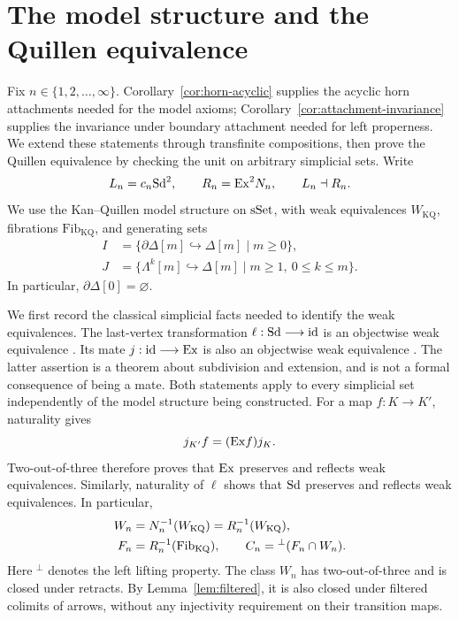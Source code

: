 \section{The model structure and the Quillen equivalence}
\label{sec:transfer}

Fix $n\in\{1,2,\ldots,\infty\}$.
Corollary~\ref{cor:horn-acyclic} supplies the acyclic horn attachments
needed for the model axioms; Corollary~\ref{cor:attachment-invariance}
supplies the invariance under boundary attachment needed for left
properness. We extend these statements through transfinite compositions,
then prove the Quillen equivalence by checking the unit on arbitrary
simplicial sets. Write
\[
 L_n=c_n\mathrm{Sd}^2,\qquad R_n=\mathrm{Ex}^2N_n,
 \qquad L_n\dashv R_n.
\]
We use the Kan--Quillen model structure on $\mathrm{sSet}$, with weak
equivalences $W_{\mathrm{KQ}}$, fibrations
$\mathrm{Fib}_{\mathrm{KQ}}$, and generating sets
\begin{align*}
 I&=\{\partial\Delta[m]\hookrightarrow\Delta[m]\mid m\geq0\},\\
 J&=\{\Lambda^k[m]\hookrightarrow\Delta[m]\mid m\geq1,
                    \ 0\leq k\leq m\}.
\end{align*}
In particular, $\partial\Delta[0]=\varnothing$.

We first record the classical simplicial facts needed to identify the
weak equivalences.  The last-vertex transformation
$\ell:\mathrm{Sd}\longrightarrow\mathrm{id}$ is an objectwise weak equivalence
\cite[Theorem~4.5]{AraMaltsiniotis2014}.  Its mate
$j:\mathrm{id}\longrightarrow\mathrm{Ex}$ is also an objectwise weak equivalence
\cite[Theorem~III.4.6]{GoerssJardine1999}.  The latter assertion is
a theorem about subdivision and extension, and is not a formal
consequence of being a mate.  Both statements apply to every
simplicial set independently of the model structure being constructed.
For a map $f:K\to K'$, naturality gives
\[
 j_{K'}f=(\mathrm{Ex} f)j_K.
\]
Two-out-of-three therefore proves that $\mathrm{Ex}$ preserves and reflects
weak equivalences.  Similarly, naturality of $\ell$ shows that $\mathrm{Sd}$
preserves and reflects weak equivalences.  In particular,
\begin{equation}\label{eq:model-classes}
 \begin{split}
 W_n&=N_n^{-1}(W_{\mathrm{KQ}})
        =R_n^{-1}(W_{\mathrm{KQ}}),\\
 F_n&=R_n^{-1}(\mathrm{Fib}_{\mathrm{KQ}}),\qquad
 C_n={}^{\perp}(F_n\cap W_n).
 \end{split}
\end{equation}
Here ${}^{\perp}$ denotes the left lifting property.  The class $W_n$
has two-out-of-three and is closed under retracts.  By
Lemma~\ref{lem:filtered}, it is also closed under filtered colimits of
arrows, without any injectivity requirement on their transition maps.

